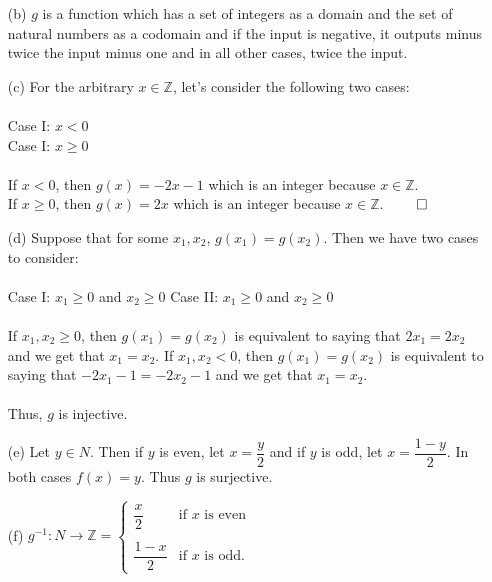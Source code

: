 \documentclass[12pt, a4paper]{article}
\newcommand{\ints}{\mathbb{Z}}
\newcommand{\rarr}{\rightarrow}
\begin{document}
\begin{itemize}
\begin{itemize}
\item[]

\item[(b)]
$g$ is a function which has a set of integers as a domain and the set of natural numbers as a codomain and if the input
is negative, it outputs minus twice the input minus one and in all other cases, twice the input.

\item[]

\item[(c)]
For the arbitrary $x \in \ints$, let's consider the following two cases:\\\\
Case I: $x < 0$\\
Case I: $x \geq 0$\\\\
If $x < 0$, then $g(x) = -2x - 1$ which is an integer because $x \in \ints$.\\
If $x \geq 0$, then $g(x) = 2x$ which is an integer because $x \in \ints$.
$\qed$

\item[]

\item[(d)]
Suppose that for some $x_1, x_2$, $g(x_1) = g(x_2)$. Then we have two cases to consider:\\\\
Case I: $x_1 \geq 0$ and $x_2 \geq 0$
Case II: $x_1 \geq 0$ and $x_2 \geq 0$\\\\
If $x_1, x_2 \geq 0$, then $g(x_1) = g(x_2)$ is equivalent to saying that $2x_1 = 2x_2$ and we get that $x_1 = x_2$.
If $x_1, x_2 < 0$, then $g(x_1) = g(x_2)$ is equivalent to saying that $-2x_1 -1 = -2x_2 - 1$ and we get that $x_1 = x_2$.\\\\
Thus, $g$ is injective.

\item[]

\item[(e)]
Let $y \in N$. Then if $y$ is even, let $x = \dfrac{y}{2}$ and if $y$ is odd, let $x = \dfrac{1 - y}{2}$.
In both cases $f(x) = y$. Thus $g$ is surjective.

\item[]

\item[(f)]
$g^{-1} : N \rarr \ints = \begin{cases} \dfrac{x}{2} & \mbox{if } x \mbox{ is even} \\\\ \dfrac{1 - x}{2} & \mbox{if } x \mbox{ is odd.} \end{cases}$
\end{itemize}


\end{itemize}
\end{document}
